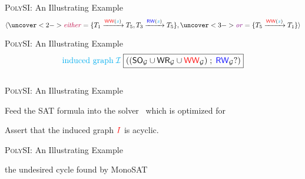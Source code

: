 \begin{frame}{\textsc{PolySI}: An Illustrating Example}
	\vspace{-0.50cm}
	\[\tuple{
		\uncover<2->{\purple{\eithervar} = \set{T_{1} \rel{\WW(\keyxvar)} T_{5},
			T_{3} \rel{\RW(\keyxvar)} T_{5}}},
		\uncover<3->{\violet{\orvar} = \set{T_{5} \rel{\WW(\keyxvar)} T_{1}}}
	}\]

	\vspace{-0.30cm}
	\begin{center}
		\resizebox{0.80\textwidth}{!}{}
	\end{center}
	\vspace{-0.50cm}

\end{frame}

\begin{frame}{\textsc{PolySI}: An Illustrating Example}
	\vspace{-0.50cm}
	\[
		\textcolor{cyan}{\text{induced graph}}\; \textcolor{cyan}{\mathcal{I}}\;
		  {\boxed{((\textup{\textsf{SO}}_{\mathcal{G}} \cup \textup{\textsf{WR}}_{\mathcal{G}} \cup \textcolor{red}{\textup{\textsf{WW}}}_{\mathcal{G}}) \;;\; \textcolor{blue}{\textup{\textsf{RW}}}_{\mathcal{G}}?)}}
	\]

  \begin{columns}
	\end{columns}

	\vspace{0.50cm}
	\vspace{-0.30cm}
\end{frame}

\begin{frame}{\textsc{PolySI}: An Illustrating Example}
	\begin{center}
		Feed the SAT formula into the  solver~
		which is optimized for 

		\vspace{0.20cm}
		\vspace{0.20cm}

		Assert that the induced graph $\textcolor{red}{I}$ is acyclic.
	\end{center}
\end{frame}

\begin{frame}{\textsc{PolySI}: An Illustrating Example}
	\begin{center}

		\vspace{0.20cm}
		the undesired cycle found by MonoSAT
	\end{center}
\end{frame}
